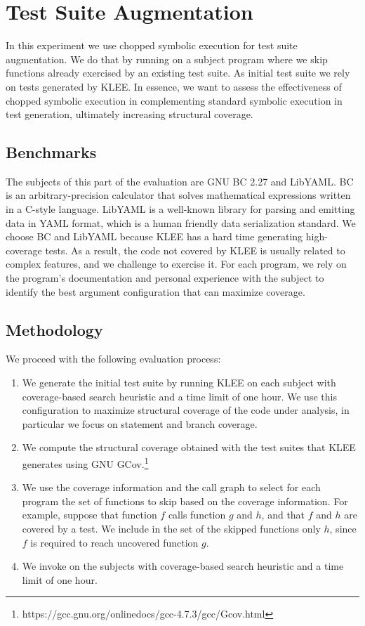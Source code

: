 \section{Test Suite Augmentation}
\label{sec:code-cover-impr}
In this experiment we use chopped symbolic execution for test suite
augmentation. We do that by running \toolname on a subject program
where we skip functions already exercised by an existing test
suite. As initial test suite we rely on tests generated by KLEE. In
essence, we want to assess the effectiveness of chopped symbolic
execution in complementing standard symbolic execution in test
generation, ultimately increasing structural coverage.

\subsection{Benchmarks}
The subjects of this part of the evaluation are
GNU \textsf{BC} 2.27 and \textsf{LibYAML}. \textsf{BC} is an
arbitrary-precision calculator that solves mathematical expressions
written in a C-style language.  \textsf{LibYAML} is a well-known
library for parsing and emitting data in YAML format, which is a human
friendly data serialization standard.  We choose \textsf{BC} and
\textsf{LibYAML} because KLEE has a hard time generating high-coverage
tests. As a result, the code not covered by KLEE is usually related to
complex features, and we challenge \toolname to exercise it. For each
program, we rely on the program's documentation and personal
experience with the subject to identify the best argument
configuration that can maximize coverage.

\subsection{Methodology}
We proceed with the following evaluation process:

\begin{enumerate}[leftmargin=*]
\item We generate the initial test suite by running KLEE on each
  subject with coverage-based search heuristic and a time limit of one
  hour. We use this configuration to maximize structural coverage of
  the code under analysis, in particular we focus on statement and
  branch coverage.
\item We compute the structural coverage obtained with the test suites
  that KLEE generates using GNU
  GCov.\footnote{https://gcc.gnu.org/onlinedocs/gcc-4.7.3/gcc/Gcov.html}
\item We use the coverage information and the call graph to select for
  each program the set of functions to skip based on the coverage
  information. For example, suppose that function $f$ calls function
  $g$ and $h$, and that $f$ and $h$ are covered by a test. We include
  in the set of the skipped functions only $h$, since $f$ is required
  to reach uncovered function $g$.
\item We invoke \toolname on the subjects with coverage-based search
  heuristic and a time limit of one hour.
\end{enumerate}

